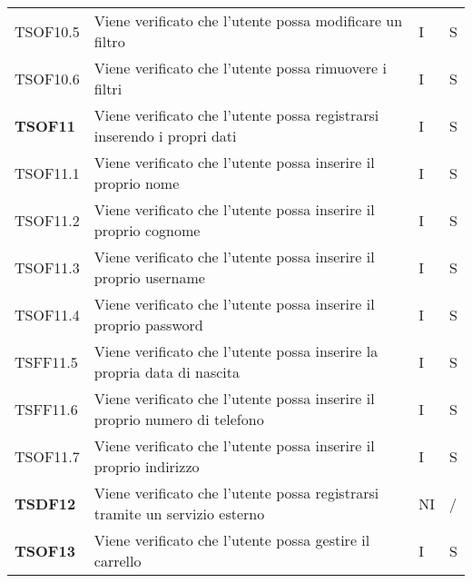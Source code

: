 \begin{center}
\begin{longtable}[!h]{p{60px} p{240px} p{35px} p{35px}}
        TSOF10.5        & Viene verificato che l'utente possa modificare un filtro                                                             & I              & S              \\
        TSOF10.6        & Viene verificato che l'utente possa rimuovere i filtri                                                               & I              & S              \\
        \textbf{TSOF11} & Viene verificato che l'utente possa registrarsi inserendo i propri dati                                              & I              & S              \\
        TSOF11.1        & Viene verificato che l'utente possa inserire il proprio nome                                                         & I              & S              \\
        TSOF11.2        & Viene verificato che l'utente possa inserire il proprio cognome                                                      & I              & S              \\
        TSOF11.3        & Viene verificato che l'utente possa inserire il proprio username                                                     & I              & S              \\
        TSOF11.4        & Viene verificato che l'utente possa inserire il proprio password                                                     & I              & S              \\
        TSFF11.5        & Viene verificato che l'utente possa inserire la propria data di nascita                                              & I              & S              \\
        TSFF11.6        & Viene verificato che l'utente possa inserire il proprio numero di telefono                                           & I              & S              \\
        TSOF11.7        & Viene verificato che l'utente possa inserire il proprio indirizzo                                                    & I              & S              \\
        \textbf{TSDF12} & Viene verificato che l'utente possa registrarsi tramite un servizio esterno                                          & NI             & /              \\
        \textbf{TSOF13} & Viene verificato che l'utente possa gestire il carrello                                                              & I              & S              \\

\end{longtable}
\end{center}

